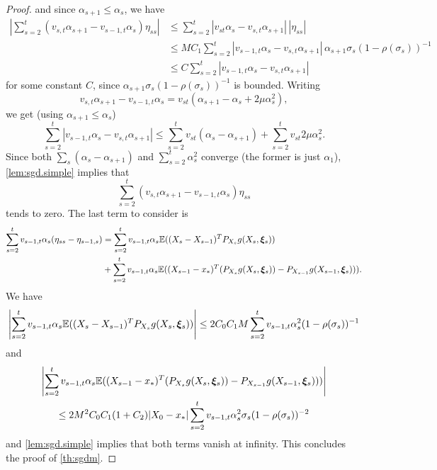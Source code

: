 \begin{proof}
and since $\alpha_{s+1}\leq \alpha_s$, we have
\begin{align*}
\left|\sum_{s=2}^t
(v_{s,t} \alpha_{s+1} - v_{s-1,t} \alpha_{s}) \eta_{ss}\right| &\leq 
\sum_{s=2}^t
|v_{st}\alpha_{s} - v_{s,t} \alpha_{s+1} |\, |\eta_{ss}|\\
&\leq MC_1 \sum_{s=2}^t |v_{s-1,t} \alpha_{s} - v_{s,t} \alpha_{s+1}|\,\alpha_{s+1} \sigma_s (1-\rho(\sigma_s))^{-1}\\
&\leq C \sum_{s=2}^t |v_{s-1,t} \alpha_{s} - v_{s,t} \alpha_{s+1}|
\end{align*}
for some constant $C$, since $\alpha_{s+1} \sigma_s (1-\rho(\sigma_s))^{-1}$ is bounded.
Writing
\[
v_{s,t} \alpha_{s+1} - v_{s-1,t} \alpha_{s} = v_{st} (\alpha_{s+1} - \alpha_s + 2\mu \alpha_s^2),
\]
we get (using $\alpha_{s+1}\leq \alpha_s$)
\[
\sum_{s=2}^t |v_{s-1,t} \alpha_{s} - v_{s,t} \alpha_{s+1}| \leq \sum_{s=2}^t  v_{st} (\alpha_s - \alpha_{s+1}) + \sum_{s=2}^t  v_{st}2\mu \alpha_s^2.
\]
Since both $\sum_s (\alpha_s - \alpha_{s+1})$ and $\sum_{s=2}^t  \alpha_s^2$ converge (the former is just $\alpha_1$), \cref{lem:sgd.simple} implies that 
\[
\sum_{s=2}^t
(v_{s,t} \alpha_{s+1} - v_{s-1,t} \alpha_{s}) \eta_{ss}
\]
tends to zero.
The last term to consider is
\begin{align*}
\sum_{s=2}^t v_{s-1,t} \alpha_{s} (\eta_{ss} - \eta_{s-1,s}) & = 
\sum_{s=2}^t v_{s-1,t} \alpha_{s}
\bm{\mathbb E}((X_{s} - X_{s-1})^TP_{X_{s}} g(X_{s}, {\bm{\xi}}_{s}))\\
&+\sum_{s=2}^t v_{s-1,t} \alpha_{s}
\bm{\mathbb E}((X_{s-1} - x_*)^T(P_{X_{s}} g(X_{s}, {\bm{\xi}}_{s})) - P_{X_{s-1}} g(X_{s-1}, {\bm{\xi}}_{s}))).
\end{align*}
We have
\[
\left|\sum_{s=2}^t v_{s-1,t} \alpha_{s}
\bm{\mathbb E}((X_{s} - X_{s-1})^TP_{X_{s}} g(X_{s}, {\bm{\xi}}_{s}))\right|
\leq 
2C_0C_1M \sum_{s=2}^t v_{s-1,t} \alpha^2_{s} (1-\rho(\sigma_s))^{-1}
\]
and
\begin{multline*}
\left|\sum_{s=2}^t v_{s-1,t} \alpha_{s}
\bm{\mathbb E}((X_{s-1} - x_*)^T(P_{X_{s}} g(X_{s}, {\bm{\xi}}_{s})) - P_{X_{s-1}} g(X_{s-1}, {\bm{\xi}}_{s})))\right|\\
 \leq 2M^2C_0C_1(1+C_2) |X_0-  x_*| \sum_{s=2}^t v_{s-1,t} \alpha^2_{s} \sigma_{s} (1-\rho(\sigma_s))^{-2} 
\end{multline*}
and \cref{lem:sgd.simple} implies that both terms vanish at infinity. This concludes the proof of \cref{th:sgdm}.
\end{proof}



